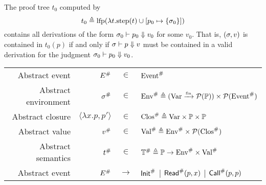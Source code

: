\documentclass{article}
\begin{document}
The proof tree $t_0$ computed by
\[t_0\triangleq\text{lfp}(\lambda t.\text{step}(t)\cup[p_0\mapsto\{\sigma_0\}])\]
contains all derivations of the form ${\sigma_0}\vdash{p_0}\Downarrow{v_0}$ for some $v_0$.
That is, $(\sigma,v)$ is contained in $t_0(p)$ if and only if ${\sigma}\vdash{p}\Downarrow{v}$ must be contained in a valid derivation for the judgment ${\sigma_0}\vdash{p_0}\Downarrow{v_0}$.
\begin{center}
  \begin{tabular}{rrcl}
    Abstract event       & ${E}^{\#}$                 & $\in$         & ${\text{Event}}^{\#}$                                                                     \\
    Abstract environment & ${\sigma}^{\#}$                   & $\in$         & ${\text{Env}}^{\#}\triangleq({\text{Var}}\xrightarrow{\mbox{\tiny{fin}}}{\mathcal{P}(\mathbb{P})})\times\mathcal{P}({\text{Event}}^{\#})$ \\
    Abstract closure     & $\langle\lambda x.p,p'\rangle$ & $\in$         & ${\text{Clos}}^{\#}\triangleq\text{Var}\times\mathbb{P}\times\mathbb{P}$              \\
    Abstract value       & ${v}^{\#}$                      & $\in$         & ${\text{Val}}^{\#}\triangleq{\text{Env}}^{\#}\times\mathcal{P}({\text{Clos}}^{\#})$                   \\
    Abstract semantics   & ${t}^{\#}$                   & $\in$         & ${\mathbb{T}}^{\#}\triangleq\mathbb{P}\rightarrow{\text{Env}}^{\#}\times{\text{Val}}^{\#}$      \\
    Abstract event       & ${E}^{\#}$                 & $\rightarrow$ & ${\textsf{Init}}^{\#}$ | ${\textsf{Read}}^{\#}(p,x)$ | ${\textsf{Call}}^{\#}(p,p)$
  \end{tabular}
\end{center}
\end{document}

